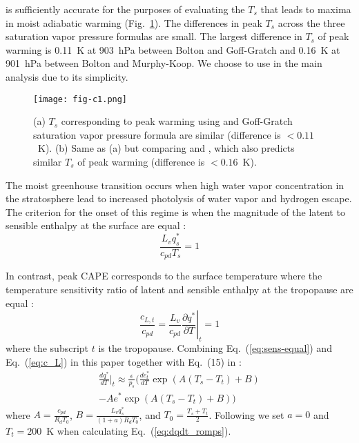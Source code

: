 \documentclass[draft,twocol]{ametsocV6.1}
\begin{document}
\cite{bolton1980} is sufficiently accurate for the purposes of evaluating the $T_s$ that leads to maxima in moist adiabatic warming (Fig.~\ref{fig:fig-c1}). The differences in peak $T_s$ across the three saturation vapor pressure formulas are small. The largest difference in $T_s$ of peak warming is 0.11~K at 903~hPa between Bolton and Goff-Gratch and 0.16~K at 901~hPa between Bolton and Murphy-Koop. We choose to use \cite{bolton1980} in the main analysis due to its simplicity.

\begin{figure}[htbp]
 \centering
 \texttt{[image: fig-c1.png]}
 \caption{(a) $T_s$ corresponding to peak warming using \cite{bolton1980} and Goff-Gratch saturation vapor pressure formula are similar (difference is $<0.11$~K). (b) Same as (a) but comparing \cite{bolton1980} and \cite{murphy2005}, which also predicts similar $T_s$ of peak warming (difference is $<0.16$~K).}\label{fig:fig-c1}
\end{figure}

\appendix[D] 
\label{app:sens-vs-mag}
The moist greenhouse transition occurs when high water vapor concentration in the stratosphere lead to increased photolysis of water vapor and hydrogen escape. The criterion for the onset of this regime is when the magnitude of the latent to sensible enthalpy at the surface are equal \citep{wordsworth2013}:
\begin{equation}
\frac{L_v q_s^*}{c_{pd} T_s} = 1
\label{eq:mag-equal}
\end{equation}

In contrast, peak CAPE corresponds to the surface temperature where the temperature sensitivity ratio of latent and sensible enthalpy at the tropopause are equal \citep[which works well for $a\ll1$,][]{romps2016}:
\begin{equation}
\frac{c_{L,t}}{c_{pd}} = \frac{L_v}{c_{pd}} \left. \frac{\partial q^*}{\partial T} \right|_t = 1
\label{eq:sens-equal}
\end{equation}
where the subscript $t$ is the tropopause. Combining Eq.~(\ref{eq:sens-equal}) and Eq.~(\ref{eq:c_L}) in this paper together with Eq.~(15) in \cite{romps2016}:
\begin{multline}
\frac{d q^*}{d T} \biggl|_t \approx \frac{\epsilon}{p_s} \biggl( \frac{d e_t^*}{d T} \exp( A (T_s - T_t) + B)\\ - A e^* \exp( A (T_s - T_t) + B) \biggl)
\label{eq:dqdt_romps}
\end{multline}
where $A = \frac{c_{pd}}{R_d T_0}$, $B = \frac{L_v q_s^*}{(1 + a) R_d T_0}$, and $T_0 = \frac{T_s + T_t}{2}$. Following \cite{romps2016} we set $a=0$ and $T_t=200$~K when calculating Eq.~(\ref{eq:dqdt_romps}).
\end{document}
